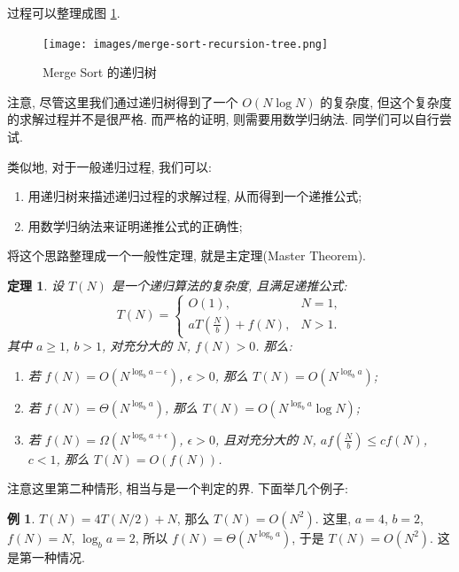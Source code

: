\documentclass[a4paper]{ctexart}
\newtheorem{theorem}{定理}
\theoremstyle{definition}
\theoremstyle{definition}
\newtheorem{example}{例}[section]
\begin{document}
过程可以整理成图 \ref{fig:merge-sort-recursion-tree}.

\begin{figure}[htbp]
  \centering
  \texttt{[image: images/merge-sort-recursion-tree.png]}
  \caption{Merge Sort 的递归树}
  \label{fig:merge-sort-recursion-tree}
\end{figure}

注意, 尽管这里我们通过递归树得到了一个 $O(N \log N)$ 的复杂度, 但这个复杂度的求解过程并不是很严格.
而严格的证明, 则需要用数学归纳法. 同学们可以自行尝试.

类似地, 对于一般递归过程, 我们可以:
\begin{enumerate}
  \item 用递归树来描述递归过程的求解过程, 从而得到一个递推公式;
  \item 用数学归纳法来证明递推公式的正确性;
\end{enumerate}
将这个思路整理成一个一般性定理, 就是主定理(Master Theorem).

\begin{theorem}
  设 $T(N)$ 是一个递归算法的复杂度, 且满足递推公式:
  \begin{equation}
    T(N) = \left\{
      \begin{array}{ll}
        O(1), & N = 1, \\
        a T(\frac{N}{b}) + f(N), & N > 1.
      \end{array}
    \right.
  \end{equation}
  其中 $a \geq 1$, $b > 1$, 对充分大的 $N$, $f(N) > 0$. 那么:
  \begin{enumerate}
    \item 若 $f(N) = O(N^{\log_b a - \epsilon})$, $\epsilon > 0$, 那么 $T(N) = O(N^{\log_b a})$;
    \item 若 $f(N) = \Theta(N^{\log_b a})$, 那么 $T(N) = O(N^{\log_b a} \log N)$;
    \item 若 $f(N) = \Omega(N^{\log_b a + \epsilon})$, $\epsilon > 0$, 且对充分大的 $N$, $a f(\frac{N}{b}) \leq c f(N)$, $c < 1$, 那么 $T(N) = O(f(N))$.
  \end{enumerate}
\end{theorem}

注意这里第二种情形, 相当与是一个判定的界. 下面举几个例子:

\begin{example}
$T(N) = 4 T(N / 2) + N$, 那么 $T(N) = O(N^2)$.
这里, $a = 4$, $b = 2$, $f(N) = N$, $\log_b a = 2$, 所以 $f(N) = \Theta(N^{\log_b a})$, 于是 $T(N) = O(N^2)$. 这是第一种情况. 
\end{example}
\end{document}
